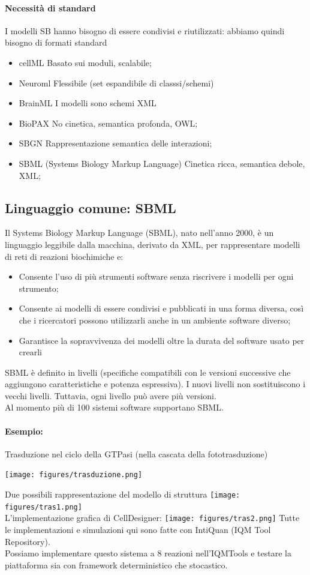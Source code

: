 \documentclass{article}
\begin{document}
\paragraph{Necessità di standard} I modelli SB hanno bisogno di essere condivisi e riutilizzati: abbiamo quindi bisogno di formati standard
\begin{itemize}
    \item cellML
        \subitem Basato sui moduli, scalabile;
    \item Neuroml
        \subitem Flessibile (set espandibile di classsi/schemi)
    \item BrainML
        \subitem I modelli sono schemi XML
    \item BioPAX
        \subitem No cinetica, semantica profonda, OWL;
    \item SBGN
        \subitem Rappresentazione semantica delle interazioni;
    \item SBML (Systems Biology Markup Language)
        \subitem Cinetica ricca, semantica debole, XML;
\end{itemize}
\subsection{Linguaggio comune: SBML}
Il Systems Biology Markup Language (SBML), nato nell'anno 2000,
è un linguaggio leggibile dalla macchina, derivato da XML, per
rappresentare modelli di reti di reazioni biochimiche e:
\begin{itemize}
    \item Consente l'uso di più strumenti software senza riscrivere i modelli
    per ogni strumento;
    \item Consente ai modelli di essere condivisi e pubblicati in una forma diversa, così che
    i ricercatori possono utilizzarli anche in un ambiente software diverso;
    \item Garantisce la sopravvivenza dei modelli oltre la durata del software
    usato per crearli
\end{itemize}
SBML è definito in livelli (specifiche compatibili con le versioni successive che aggiungono
caratteristiche e potenza espressiva). I nuovi livelli non sostituiscono i vecchi
livelli. Tuttavia, ogni livello può avere più versioni.\\
Al momento più di 100 sistemi software supportano SBML.
\paragraph{Esempio:} Trasduzione nel ciclo della GTPasi (nella cascata della fototrasduzione)
\begin{center}
    \texttt{[image: figures/trasduzione.png]}
\end{center}
Due possibili rappresentazione del modello di struttura
\texttt{[image: figures/tras1.png]}\\
L'implementazione grafica di CellDesigner:
\texttt{[image: figures/tras2.png]}
Tutte le implementazioni e simulazioni qui sono fatte con IntiQuan (IQM Tool Repository).\\
Possiamo implementare questo sistema a 8 reazioni nell'IQMTools e testare la piattaforma sia con framework deterministico
che stocastico.
\end{document}

